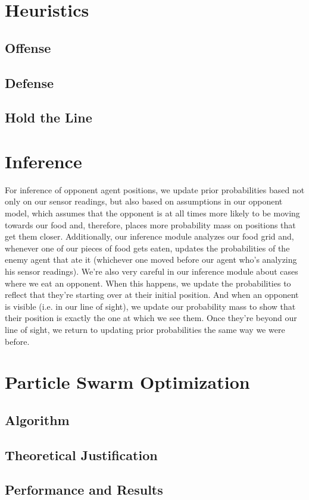 \documentclass[12pt]{article}
\begin{document}
\section{Heuristics}
\subsection{Offense}
\subsection{Defense}
\subsection{Hold the Line}

\section{Inference}
For inference of opponent agent positions, we update prior probabilities based not only on our sensor readings, but also based on assumptions in our opponent model, which assumes that the opponent is at all times more likely to be moving towards our food and, therefore, places more probability mass on positions that get them closer. Additionally, our inference module analyzes our food grid and, whenever one of our pieces of food gets eaten, updates the probabilities of the enemy agent that ate it (whichever one moved before our agent who's analyzing his sensor readings). We're also very careful in our inference module about cases where we eat an opponent. When this happens, we update the probabilities to reflect that they're starting over at their initial position. And when an opponent is visible (i.e. in our line of sight), we update our probability mass to show that their position is exactly the one at which we see them. Once they're beyond our line of sight, we return to updating prior probabilities the same way we were before.
\section{Particle Swarm Optimization}
\subsection{Algorithm}
\subsection{Theoretical Justification}
\subsection{Performance and Results}
\end{document}
